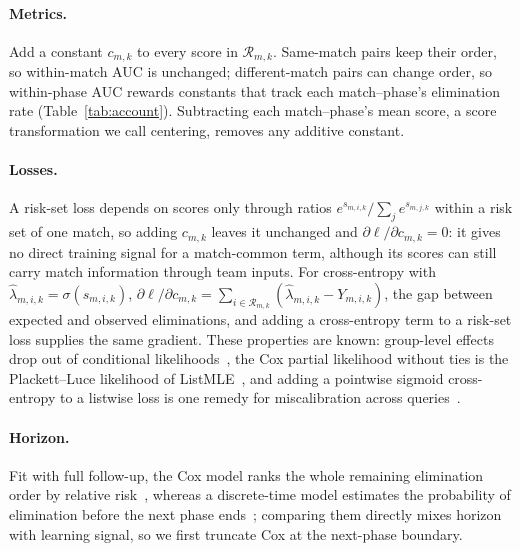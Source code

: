\documentclass[sigconf,anonymous]{acmart}
\begin{document}
\paragraph{Metrics.}
Add a constant $c_{m,k}$ to every score in $\mathcal{R}_{m,k}$. Same-match pairs keep their order, so within-match AUC is unchanged; different-match pairs can change order, so within-phase AUC rewards constants that track each match--phase's elimination rate (Table~\ref{tab:account}). Subtracting each match--phase's mean score, a score transformation we call centering, removes any additive constant.

\paragraph{Losses.}
A risk-set loss depends on scores only through ratios $e^{s_{m,i,k}}/\sum_{j}e^{s_{m,j,k}}$ within a risk set of one match, so adding $c_{m,k}$ leaves it unchanged and $\partial\ell/\partial c_{m,k}=0$: it gives no direct training signal for a match-common term, although its scores can still carry match information through team inputs. For cross-entropy with $\hat\lambda_{m,i,k}=\sigma(s_{m,i,k})$, $\partial\ell/\partial c_{m,k}=\sum_{i\in\mathcal{R}_{m,k}}(\hat\lambda_{m,i,k}-Y_{m,i,k})$, the gap between expected and observed eliminations, and adding a cross-entropy term to a risk-set loss supplies the same gradient. These properties are known: group-level effects drop out of conditional likelihoods~\cite{Chamberlain80}, the Cox partial likelihood without ties is the Plackett--Luce likelihood of ListMLE~\cite{Xia08}, and adding a pointwise sigmoid cross-entropy to a listwise loss is one remedy for miscalibration across queries~\cite{Bai23}.

\paragraph{Horizon.}
Fit with full follow-up, the Cox model ranks the whole remaining elimination order by relative risk~\cite{Cox72}, whereas a discrete-time model estimates the probability of elimination before the next phase ends~\cite{SingerWillett93,Gensheimer19}; comparing them directly mixes horizon with learning signal, so we first truncate Cox at the next-phase boundary.
\end{document}
